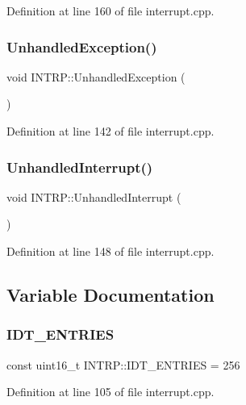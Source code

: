Definition at line 160 of file interrupt.\+cpp.

\mbox{\label{namespace_i_n_t_r_p_a7732859732913734b09dd07030c41991}} 
\subsubsection{\texorpdfstring{Unhandled\+Exception()}{UnhandledException()}}
{\footnotesize\ttfamily void I\+N\+T\+R\+P\+::\+Unhandled\+Exception (\begin{DoxyParamCaption}{ }\end{DoxyParamCaption})}



Definition at line 142 of file interrupt.\+cpp.

\mbox{\label{namespace_i_n_t_r_p_a13c03019c9d7b305743516310096a82a}} 
\subsubsection{\texorpdfstring{Unhandled\+Interrupt()}{UnhandledInterrupt()}}
{\footnotesize\ttfamily void I\+N\+T\+R\+P\+::\+Unhandled\+Interrupt (\begin{DoxyParamCaption}{ }\end{DoxyParamCaption})}



Definition at line 148 of file interrupt.\+cpp.



\subsection{Variable Documentation}
\mbox{\label{namespace_i_n_t_r_p_a1022b4dc1d9af1ea393f7f038ff421ce}} 
\subsubsection{\texorpdfstring{I\+D\+T\+\_\+\+E\+N\+T\+R\+I\+ES}{IDT\_ENTRIES}}
{\footnotesize\ttfamily const uint16\+\_\+t I\+N\+T\+R\+P\+::\+I\+D\+T\+\_\+\+E\+N\+T\+R\+I\+ES = 256}



Definition at line 105 of file interrupt.\+cpp.

